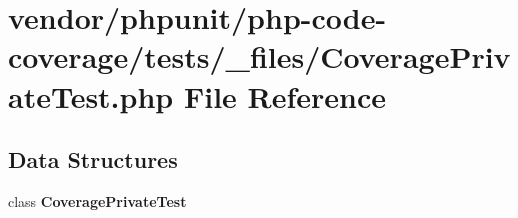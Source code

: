 \section{vendor/phpunit/php-\/code-\/coverage/tests/\+\_\+files/\+Coverage\+Private\+Test.php File Reference}
\label{php-code-coverage_2tests_2__files_2_coverage_private_test_8php}
\subsection*{Data Structures}
\begin{DoxyCompactItemize}
\item 
class {\bf Coverage\+Private\+Test}
\end{DoxyCompactItemize}

